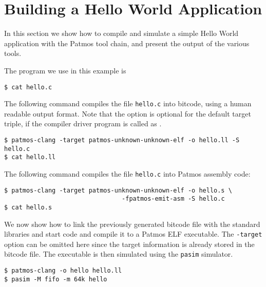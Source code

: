 \section{Building a Hello World Application}

In this section we show how to compile and simulate a simple Hello World application with the Patmos tool chain, and present the output of the
various tools.

The program we use in this example is
\footnotesize
\begin{verbatim}
$ cat hello.c
\end{verbatim}


\normalsize
The following command compiles the file \texttt{hello.c} into bitcode, using a human readable output format.
Note that the  option is optional for the default target triple, if the compiler driver program is called as
.
\footnotesize
\begin{verbatim}
$ patmos-clang -target patmos-unknown-unknown-elf -o hello.ll -S hello.c
$ cat hello.ll
\end{verbatim}


\normalsize
The following command compiles the file \texttt{hello.c} into Patmos assembly code:
\footnotesize
\begin{verbatim}
$ patmos-clang -target patmos-unknown-unknown-elf -o hello.s \
                                -fpatmos-emit-asm -S hello.c
$ cat hello.s
\end{verbatim}


\normalsize
We now show how to link the previously generated bitcode file with the standard libraries and start code and compile it to a Patmos ELF
executable. The \texttt{-target} option can be omitted here since the target information is already stored in the bitcode file. 
The executable is then simulated using the \texttt{pasim} simulator.
\footnotesize
\begin{verbatim}
$ patmos-clang -o hello hello.ll
$ pasim -M fifo -m 64k hello
\end{verbatim}


\normalsize

